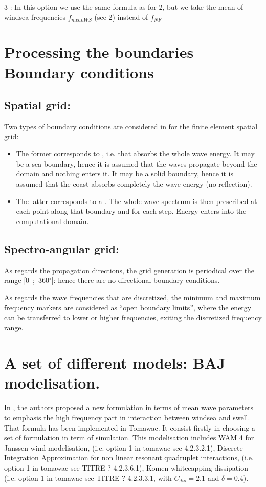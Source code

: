  3 : In this option we use the same formula as for 2, but we take the mean of windsea frequencies $f_{meanWS}$ (see \ref{se:baj}) instead of $f_{NF}$

\section{ Processing the boundaries -- Boundary conditions}

\subsection{ Spatial grid:}

 Two types of boundary conditions are considered in \tomawac for the finite element spatial grid:

\begin{itemize}
\item  The former corresponds to , i.e. that absorbs the whole wave energy. It may be a sea boundary, hence it is assumed that the waves propagate beyond the domain and nothing enters it. It may be a solid boundary, hence it is assumed that the coast absorbs completely the wave energy (no reflection).

\item  The latter corresponds to a . The whole wave spectrum is then prescribed at each point along that boundary and for each step. Energy enters into the computational domain.
\end{itemize}


\subsection{ Spectro-angular grid:}

 As regards the propagation directions, the grid generation is periodical over the range [0~;~360${}^\circ$]: hence there are no directional boundary conditions.

 As regards the wave frequencies that are discretized, the minimum and maximum frequency markers are considered as ``open boundary limits'', where the energy can be transferred to lower or higher frequencies, exiting the discretized frequency range.


\section{ A set of different models: BAJ modelisation. }
\label{se:baj}
 In \cite{Bidlot2007}, the authors proposed a new formulation in terms of mean wave parameters to emphasis the high frequency part in interaction between windsea and swell. That formula has been implemented in Tomawac. It consist firstly in choosing a set of formulation in term of simulation. This modelisation includes WAM 4 for Janssen wind modelisation, (i.e. option 1 in tomawac see 4.2.3.2.1), Discrete Integration Approximation for non linear resonant quadruplet interactions, (i.e. option 1 in tomawac see TITRE ? 4.2.3.6.1), Komen whitecapping dissipation (i.e. option 1 in tomawac see  TITRE ? 4.2.3.3.1, with $C_{dis}=2.1$ and $\delta=0.4$).

